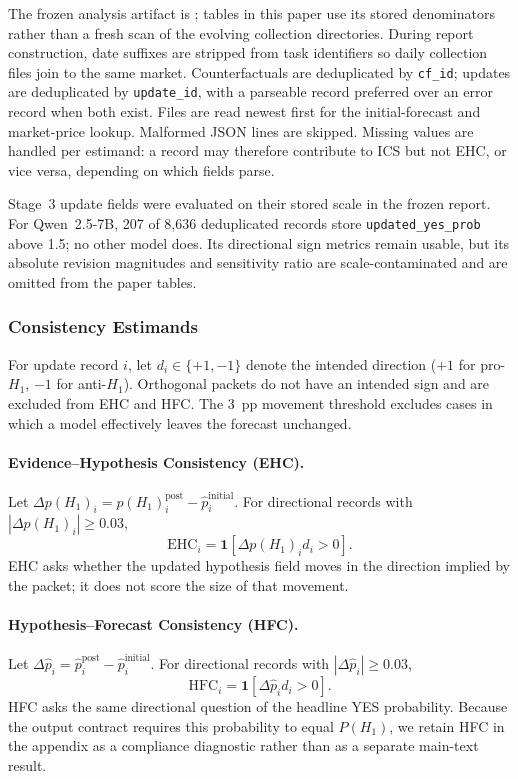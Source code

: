 The frozen analysis artifact is
; tables in
this paper use its stored denominators rather than a fresh scan of the evolving
collection directories.  During report construction, date suffixes are stripped from
task identifiers so daily collection files join to the same market.  Counterfactuals
are deduplicated by \texttt{cf\_id}; updates are deduplicated by
\texttt{update\_id}, with a parseable record preferred over an error record when both
exist.  Files are read newest first for the initial-forecast and market-price lookup.
Malformed JSON lines are skipped.  Missing values are handled per estimand: a record
may therefore contribute to ICS but not EHC, or vice versa, depending on which fields
parse.

Stage~3 update fields were evaluated on their stored scale in the frozen report.
For Qwen~2.5-7B, 207 of 8,636 deduplicated records store
\texttt{updated\_yes\_prob} above 1.5; no other model does. Its directional sign
metrics remain usable, but its absolute revision magnitudes and sensitivity
ratio are scale-contaminated and are omitted from the paper tables.

\subsubsection{Consistency Estimands}
\label{app:metric-definitions}

For update record \(i\), let \(d_i\in\{+1,-1\}\) denote the intended direction
(\(+1\) for pro-$H_1$, \(-1\) for anti-$H_1$).  Orthogonal packets do not have an
intended sign and are excluded from EHC and HFC.  The 3~pp movement threshold excludes
cases in which a model effectively leaves the forecast unchanged.

\paragraph{Evidence--Hypothesis Consistency (EHC).}
Let \(\Delta p(H_1)_i=p(H_1)_i^{\mathrm{post}}-\hat p_i^{\mathrm{initial}}\).
For directional records with \(|\Delta p(H_1)_i|\geq0.03\),
\begin{equation}
  \mathrm{EHC}_i=\mathbf{1}\!\left[\Delta p(H_1)_i d_i>0\right].
  \label{eq:ehc}
\end{equation}
EHC asks whether the updated hypothesis field moves in the direction implied by the
packet; it does not score the size of that movement.

\paragraph{Hypothesis--Forecast Consistency (HFC).}
Let \(\Delta\hat p_i=\hat p_i^{\mathrm{post}}-\hat p_i^{\mathrm{initial}}\).
For directional records with \(|\Delta\hat p_i|\geq0.03\),
\begin{equation}
  \mathrm{HFC}_i=\mathbf{1}\!\left[\Delta\hat p_i d_i>0\right].
  \label{eq:hfc}
\end{equation}
HFC asks the same directional question of the headline YES probability. Because
the output contract requires this probability to equal $P(H_1)$, we retain HFC in
the appendix as a compliance diagnostic rather than as a separate main-text result.

